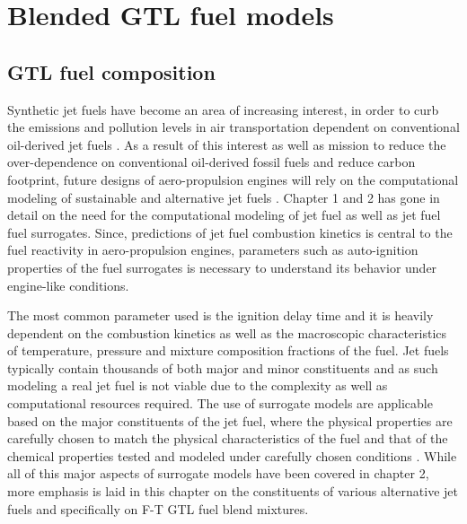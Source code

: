 \chapter{Blended GTL fuel models}

\section{GTL fuel composition}


Synthetic jet fuels have become an area of increasing interest, in order to curb the emissions and pollution levels in air transportation dependent on conventional oil-derived jet fuels \cite{RePEc:eee:energy:v:43:y:2012:i:1:p:111-123}. As a result of this interest as well as mission to reduce the over-dependence on conventional oil-derived fossil fuels and reduce carbon footprint, future designs of aero-propulsion engines will rely on the computational modeling of sustainable and alternative jet fuels \cite{Corporan2007EmissionsFuel}\cite{Hermann2006ChemicalFuel}. Chapter 1 and 2 has gone in detail on the need for the computational modeling of jet fuel as well as jet fuel fuel surrogates. Since, predictions of jet fuel combustion kinetics is central to the fuel reactivity in aero-propulsion engines, parameters such as auto-ignition properties of the fuel surrogates is necessary to understand its behavior under engine-like conditions. 

The most common parameter used is the ignition delay time and it is heavily dependent on the combustion kinetics as well as the macroscopic characteristics of temperature, pressure and mixture composition fractions of the fuel. Jet fuels typically contain thousands of both major and minor constituents and as such modeling a real jet fuel is not viable due to the complexity as well as computational resources required. The use of surrogate models are applicable based on the major constituents of the jet fuel, where the physical properties are carefully chosen to match the physical characteristics of the fuel and that of the chemical properties tested and modeled under carefully chosen conditions \cite{Edwards2001SurrogateFuels}\cite{Huber2008SurrogateCurve}. While all of this major aspects of surrogate models have been covered in chapter 2, more emphasis is laid in this chapter on the constituents of various alternative jet fuels and specifically on F-T GTL fuel blend mixtures.


\vspace{2cm}


